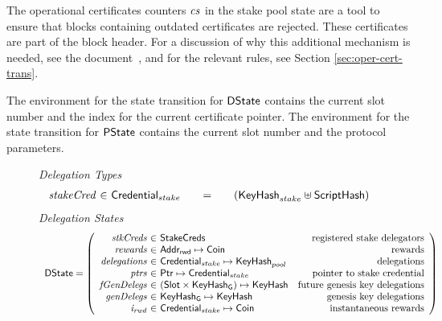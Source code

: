 The operational certificates counters $\mathit{cs}$ in the stake pool state are a
tool to ensure that blocks containing outdated certificates are rejected.
These certificates are part of the block header.
For a discussion of why this additional mechanism is needed,
see the document~\cite{delegation_design}, and for
the relevant rules, see Section \ref{sec:oper-cert-trans}.

The environment for the state transition for $\mathsf{DState}$ contains the current slot number
and the index for the current certificate pointer.
The environment for the state transition for $\mathsf{PState}$ contains the current slot number
and the protocol parameters.

\begin{figure}
  \emph{Delegation Types}
  \begin{equation*}
    \begin{array}{r@{~\in~}l@{\qquad=\qquad}lr}
      \var{stakeCred} & \StakeCredential & (\KeyHash_{stake} \uniondistinct
                                       \HashScr) \\
    \end{array}
  \end{equation*}
  \emph{Delegation States}
  \begin{equation*}
    \begin{array}{l}
    \DState =
    \left(\begin{array}{r@{~\in~}lr}
            \var{stkCreds} & \StakeCreds & \text{registered stake delegators}\\
            \var{rewards} & \AddrRWD \mapsto \Coin & \text{rewards}\\
            \var{delegations} & \StakeCredential \mapsto \KeyHash_{pool} & \text{delegations}\\
            \var{ptrs} & \Ptr \mapsto \StakeCredential & \text{pointer to stake credential}\\
            \var{fGenDelegs} & (\Slot\times\KeyHashGen) \mapsto \KeyHash & \text{future genesis key delegations}\\
            \var{genDelegs} & \KeyHashGen \mapsto \KeyHash & \text{genesis key delegations}\\
            \var{i_{rwd}} & \StakeCredential \mapsto \Coin & \text{instantaneous rewards}\\
          \end{array}
      \right)
      \\
    \\

\end{array}
\end{equation*}
\end{figure}
